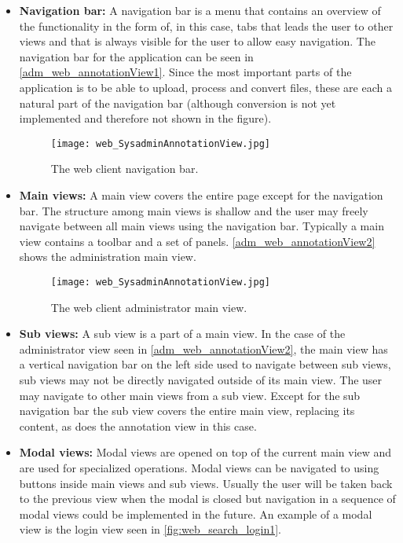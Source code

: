 \begin{itemize}
    \item \textbf{Navigation bar:}
A navigation bar is a menu that contains an overview of the functionality in the form of, in this case, tabs that leads the user to other views and that is always visible for the user to allow easy navigation. The navigation bar for the application can be seen in \autoref{adm_web_annotationView1}. Since the most important parts of the application is to be able to upload, process and convert files, these are each a natural part of the navigation bar (although conversion is not yet implemented and therefore not shown in the figure).

\begin{figure}
 \centering
 \texttt{[image: web\_SysadminAnnotationView.jpg]}
 \caption{\footnotesize  The web client navigation bar.}
 \label{adm_web_annotationView1}
\end{figure}

	\item \textbf{Main views:}
A main view covers the entire page except for the navigation bar. The structure among main views is shallow and the user may freely navigate between all main views using the navigation bar. Typically a main view contains a toolbar and a set of panels. \autoref{adm_web_annotationView2} shows the administration main view.

\begin{figure}
 \centering
 \texttt{[image: web\_SysadminAnnotationView.jpg]}
 \caption{\footnotesize The web client administrator main view.}
 \label{adm_web_annotationView2}
\end{figure}

	\item \textbf{Sub views:}
A sub view is a part of a main view. In the case of the administrator view seen in \autoref{adm_web_annotationView2}, the main view has a vertical navigation bar on the left side used to navigate between sub views, sub views may not be directly navigated outside of its main view. The user may navigate to other main views from a sub view. Except for the sub navigation bar the sub view covers the entire main view, replacing its content, as does the annotation view in this case.

	\item \textbf{Modal views:}
Modal views are opened on top of the current main view and are used for specialized operations. Modal views can be navigated to using buttons inside main views and sub views. Usually the user will be taken back to the previous view when the modal is closed but navigation in a sequence of modal views could be implemented in the future. An example
of a modal view is the login view seen in \autoref{fig:web_search_login1}.


\end{itemize}
